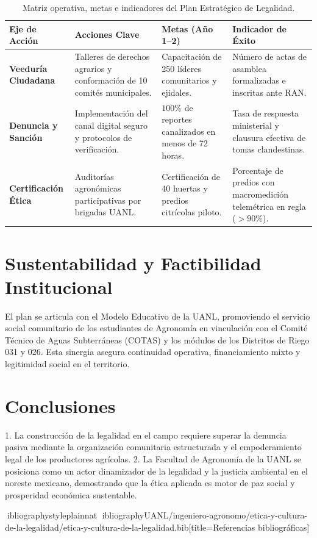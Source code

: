 \documentclass[spanish,letterpaper,oneside]{article}
\begin{document}
\begin{table}[htbp]
\centering
\small
\caption{Matriz operativa, metas e indicadores del Plan Estratégico de Legalidad.}
\label{tab:plan-legalidad}
\begin{tabularx}{\textwidth}{@{}l Y Y Y@{}}
\toprule
\textbf{Eje de Acción} & \textbf{Acciones Clave} & \textbf{Metas (Año 1--2)} & \textbf{Indicador de Éxito} \\
\midrule
\textbf{Veeduría Ciudadana} & Talleres de derechos agrarios y conformación de 10 comités municipales. & Capacitación de 250 líderes comunitarios y ejidales. & Número de actas de asamblea formalizadas e inscritas ante RAN. \\
\addlinespace
\textbf{Denuncia y Sanción} & Implementación del canal digital seguro y protocolos de verificación. & $100\%$ de reportes canalizados en menos de 72 horas. & Tasa de respuesta ministerial y clausura efectiva de tomas clandestinas. \\
\addlinespace
\textbf{Certificación Ética} & Auditorías agronómicas participativas por brigadas UANL. & Certificación de 40 huertas y predios citrícolas piloto. & Porcentaje de predios con macromedición telemétrica en regla ($>90\%$). \\
\bottomrule
\end{tabularx}
\end{table}

\section{Sustentabilidad y Factibilidad Institucional}
El plan se articula con el Modelo Educativo de la UANL, promoviendo el servicio social comunitario de los estudiantes de Agronomía en vinculación con el Comité Técnico de Aguas Subterráneas (COTAS) y los módulos de los Distritos de Riego 031 y 026. Esta sinergia asegura continuidad operativa, financiamiento mixto y legitimidad social en el territorio.

\section{Conclusiones}
1. La construcción de la legalidad en el campo requiere superar la denuncia pasiva mediante la organización comunitaria estructurada y el empoderamiento legal de los productores agrícolas.
2. La Facultad de Agronomía de la UANL se posiciona como un actor dinamizador de la legalidad y la justicia ambiental en el noreste mexicano, demostrando que la ética aplicada es motor de paz social y prosperidad económica sustentable.

\newpage
ibliographystyle{plainnat}
ibliography{UANL/ingeniero-agronomo/etica-y-cultura-de-la-legalidad/etica-y-cultura-de-la-legalidad.bib}[title={Referencias bibliográficas}]
\end{document}
